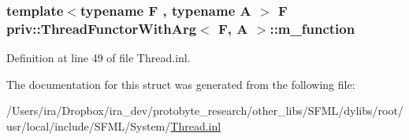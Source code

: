 \hypertarget{structpriv_1_1_thread_functor_with_arg_ab12992af3112f15df4b6f0dbce3137b9}{
\subsubsection[{m\-\_\-function}]{\setlength{\rightskip}{0pt plus 5cm}template$<$typename F , typename A $>$ F {\bf priv\-::\-Thread\-Functor\-With\-Arg}$<$ F, A $>$\-::m\-\_\-function}}\label{structpriv_1_1_thread_functor_with_arg_ab12992af3112f15df4b6f0dbce3137b9}


Definition at line 49 of file Thread.\-inl.



The documentation for this struct was generated from the following file\-:\begin{DoxyCompactItemize}
\item 
/\-Users/ira/\-Dropbox/ira\-\_\-dev/protobyte\-\_\-research/other\-\_\-libs/\-S\-F\-M\-L/dylibs/root/usr/local/include/\-S\-F\-M\-L/\-System/\hyperlink{_thread_8inl}{Thread.\-inl}\end{DoxyCompactItemize}
